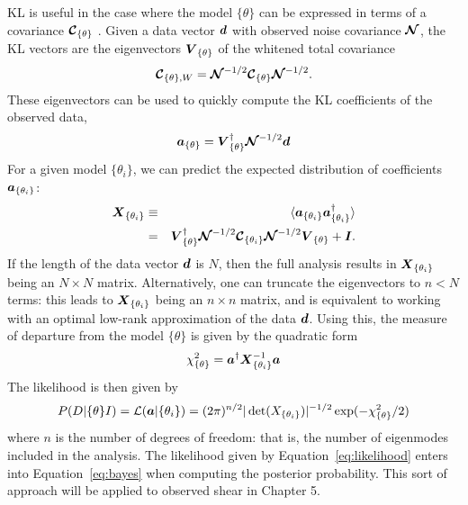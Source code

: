 KL is useful in the case where the model $\{\theta\}$ can be expressed in
terms of a covariance $\boldsymbol{\mathcal{C}}_{\{\theta\}}$ \citep[see][]{Vogeley96}.
Given a data vector $\boldsymbol{d}$ with observed noise covariance
$\boldsymbol{\mathcal{N}}$, the KL vectors are the eigenvectors
$\boldsymbol{V}_{\{\theta\}}$ of the whitened total covariance 
\begin{equation}
  \boldsymbol{\mathcal{C}}_{\{\theta\}, W} =
  \boldsymbol{\mathcal{N}}^{-1/2}
  \boldsymbol{\mathcal{C}}_{\{\theta\}}
  \boldsymbol{\mathcal{N}}^{-1/2}.
\end{equation}
These eigenvectors can be used to quickly compute the KL coefficients of
the observed data,
\begin{equation}
  \boldsymbol{a}_{\{\theta\}} = \boldsymbol{V}^\dagger_{\{\theta\}}
  \boldsymbol{\mathcal{N}}^{-1/2}\boldsymbol{d}
\end{equation}
For a given model $\{\theta_i\}$, we can predict the expected
distribution of coefficients $\boldsymbol{a}_{\{\theta_i\}}$:
\begin{eqnarray}
  \boldsymbol{X}_{\{\theta_i\}}
  & \equiv & \langle\boldsymbol{a}_{\{\theta_i\}}
  \boldsymbol{a}_{\{\theta_i\}}^\dagger\rangle\nonumber\\
  &=& \boldsymbol{V}_{\{\theta\}}^\dagger \boldsymbol{\mathcal{N}}^{-1/2} 
  \boldsymbol{\mathcal{C}}_{\{\theta_i\}}\boldsymbol{\mathcal{N}}^{-1/2}\boldsymbol{V}_{\{\theta\}}
  + \boldsymbol{I}.
\end{eqnarray}
If the length of the data vector $\boldsymbol{d}$ is $N$, then the full
analysis results in $\boldsymbol{X}_{\{\theta_i\}}$ being an $N\times N$ matrix.
Alternatively, one can truncate the eigenvectors to $n < N$ terms:
this leads to $\boldsymbol{X}_{\{\theta_i\}}$ being an $n\times n$ matrix, and
is equivalent to working with an optimal low-rank approximation of the
data $\boldsymbol{d}$.
Using this, the measure of departure from the model $\{\theta\}$
is given by the quadratic form
\begin{equation}
  \chi_{\{\theta\}}^2 = \boldsymbol{a}^\dagger\boldsymbol{X}_{\{\theta_i\}}^{-1}\boldsymbol{a}
\end{equation}
The likelihood is then given by
\begin{equation}
  \label{eq:likelihood}
  P(D|\{\theta\}I) =
  \mathcal{L}(\boldsymbol{a}|\{\theta_i\}) = 
  (2\pi)^{n/2} |\det(X_{\{\theta_i\}})|^{-1/2}
  \exp(-\chi_{\{\theta\}}^2/2)
\end{equation}
where $n$ is the number of degrees of freedom: that is, the number
of eigenmodes included in the analysis.  The likelihood given by
Equation~\ref{eq:likelihood} enters into Equation~\ref{eq:bayes} when
computing the posterior probability.  This sort of approach will be
applied to observed shear in Chapter 5.


